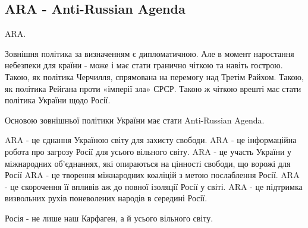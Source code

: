  
 
 
 
 
\subsection{ARA - Anti-Russian Agenda}

ARA.

Зовнішня політика за визначенням є дипломатичною. Але в момент наростання
небезпеки для країни - може і має стати гранично чіткою та навіть гострою.
Такою, як політика Черчилля, спрямована на перемогу над Третім Райхом. Такою,
як політика Рейгана проти «імперії зла» СРСР. Такою ж чіткою врешті має стати
політика України щодо Росії. 

Основою зовнішньої політики України має стати Anti-Russian Agenda.  

ARA - це єднання Україною світу для захисту свободи. 
ARA - це інформаційна робота про загрозу Росії для усього вільного світу. 
ARA - це участь України у міжнародних об’єднаннях, які опираються на цінності свободи, що ворожі для Росії
ARA - це творення міжнародних коаліцій з метою послаблення Росії. 
ARA - це скорочення її впливів аж до повної ізоляції Росії у світі. 
ARA - це підтримка визвольних рухів поневолених народів в середині Росії. 

Росія - не лише наш Карфаген, а й усього вільного світу.
